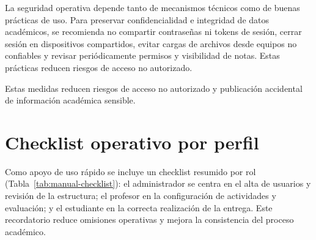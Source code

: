 La seguridad operativa depende tanto de mecanismos t\'ecnicos
como de buenas pr\'acticas de uso.
Para preservar confidencialidad e integridad de datos acad\'emicos, se recomienda no compartir contrase\~nas ni tokens de sesi\'on, cerrar sesi\'on en dispositivos compartidos, evitar cargas de archivos desde equipos no confiables y revisar peri\'odicamente permisos y visibilidad de notas. Estas pr\'acticas reducen riesgos de acceso no autorizado.

Estas medidas reducen riesgos de acceso no autorizado
y publicaci\'on accidental de informaci\'on acad\'emica sensible.

\FloatBarrier

\section{Checklist operativo por perfil}

Como apoyo de uso r\'apido se incluye un checklist resumido por rol (Tabla~\ref{tab:manual-checklist}): el administrador se centra en el alta de usuarios y revisi\'on de la estructura; el profesor en la configuraci\'on de actividades y evaluaci\'on; y el estudiante en la correcta realizaci\'on de la entrega. Este recordatorio reduce omisiones operativas y mejora la consistencia del proceso acad\'emico.

